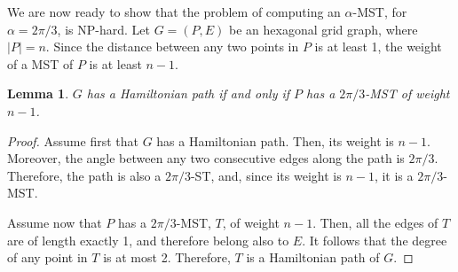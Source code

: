 \documentclass[11pt]{article}
\newtheorem{lemma}[theorem]{Lemma}
\begin{document}
We are now ready to show that the problem of computing an $\alpha$-MST, for $\alpha=2\pi/3$, is NP-hard.
Let $G=(P,E)$ be an hexagonal grid graph, where $|P|=n$. Since the distance between any two points in $P$ is at least 1, the weight of a MST of $P$ is at least $n-1$.
\begin{lemma}
$G$ has a Hamiltonian path if and only if $P$ has a $2\pi/3$-MST of weight $n-1$. 
\end{lemma}
\begin{proof}
Assume first that $G$ has a Hamiltonian path. Then, its weight is $n-1$. Moreover, the angle between any two consecutive edges along the path is $2\pi/3$. Therefore, the path is also a $2\pi/3$-ST, and, since its weight is $n-1$, it is a $2\pi/3$-MST.

Assume now that $P$ has a $2\pi/3$-MST, $T$, of weight $n-1$.
Then, all the edges of $T$ are of length exactly 1, and therefore belong also to $E$. It follows that the degree of any point in $T$ is at most 2. Therefore, $T$ is a Hamiltonian path of $G$. 
\end{proof}
\end{document}
